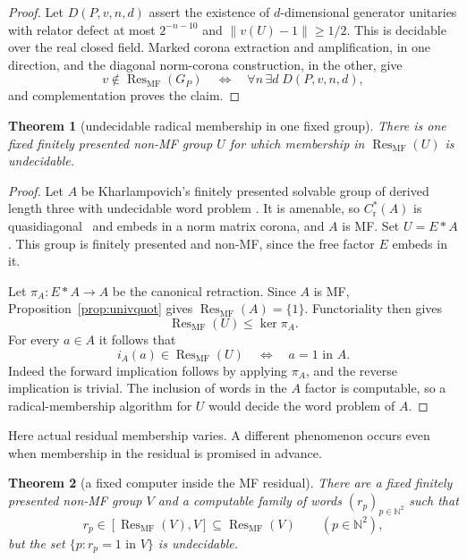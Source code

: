 \documentclass[11pt]{amsart}
\newcommand{\leanverified}[2]{\ignorespaces}
\newtheorem{theorem}{Theorem}[section]
\theoremstyle{definition}
\theoremstyle{remark}
\theoremstyle{plain}
\newcommand{\N}{\mathbb N}
\newcommand{\Cred}{C^*_{\mathrm r}}
\begin{document}
\begin{proof}
Let $D(P,v,n,d)$ assert the existence of $d$-dimensional generator unitaries
with relator defect at most $2^{-n-10}$ and $\|v(U)-1\|\geq1/2$.  This is
decidable over the real closed field.  Marked corona extraction and
amplification, in one direction, and the diagonal norm-corona construction,
in the other, give
\[
 v\notin\operatorname{Res}_{\mathrm{MF}}(G_P)
 \quad\Longleftrightarrow\quad
 \forall n\,\exists d\;D(P,v,n,d),
\]
and complementation proves the claim.
\end{proof}

\begin{theorem}[undecidable radical membership in one fixed group]
\label{thm:fixed-radical-membership}
There is one fixed finitely presented non-MF group $U$ for which membership in
$\operatorname{Res}_{\mathrm{MF}}(U)$ is undecidable.
\end{theorem}

\begin{proof}
Let $A$ be Kharlampovich's finitely presented solvable group of derived length
three with undecidable word problem \cite{Kharlampovich}.  It is amenable, so
$\Cred(A)$ is quasidiagonal~\cite{TWW} and embeds in a norm matrix
corona, and $A$ is MF\@.  Set $U=E*A$.  This group is finitely presented and non-MF, since
the free factor $E$ embeds in it.

Let $\pi_A\colon E*A\to A$ be the canonical retraction.  Since $A$ is MF,
Proposition~\ref{prop:univquot} gives
$\operatorname{Res}_{\mathrm{MF}}(A)=\{1\}$.  Functoriality then gives
\[
 \operatorname{Res}_{\mathrm{MF}}(U)\leq\ker\pi_A.
\]
For every $a\in A$ it follows that
\[
 i_A(a)\in\operatorname{Res}_{\mathrm{MF}}(U)
 \quad\Longleftrightarrow\quad a=1\text{ in }A.
\]
Indeed the forward implication follows by applying $\pi_A$, and the reverse
implication is trivial.  The inclusion of words in the $A$ factor is
computable, so a radical-membership algorithm for $U$ would decide the word
problem of $A$.
\end{proof}

Here actual residual membership varies.  A different phenomenon occurs even
when membership in the residual is promised in advance.

\begin{theorem}[a fixed computer inside the MF residual]
\label{thm:fixed-radical-computer}
There are a fixed finitely presented non-MF group $V$ and a computable family
of words $(r_p)_{p\in\N^2}$ such that
\[
 r_p\in
 [\operatorname{Res}_{\mathrm{MF}}(V),V]
 \subseteq\operatorname{Res}_{\mathrm{MF}}(V)
 \qquad(p\in\N^2),
\]
but the set $\{p:r_p=1\text{ in }V\}$ is undecidable.
\leanverified{Computability/MFRadicalComputer}{GroupApproximation.MFRadicalComputer.closed_package}
\leanverified{Computability/MFRadicalComputer}{GroupApproximation.MFRadicalComputer.word_mem_commutator_residual}
\end{theorem}
\end{document}
